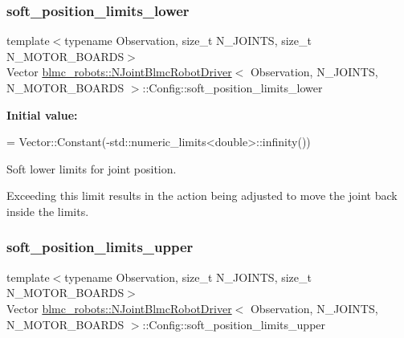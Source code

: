 \subsubsection{\texorpdfstring{soft\+\_\+position\+\_\+limits\+\_\+lower}{soft\_position\_limits\_lower}}
{\footnotesize\ttfamily template$<$typename Observation, size\+\_\+t N\+\_\+\+J\+O\+I\+N\+TS, size\+\_\+t N\+\_\+\+M\+O\+T\+O\+R\+\_\+\+B\+O\+A\+R\+DS$>$ \\
Vector \hyperlink{classblmc__robots_1_1NJointBlmcRobotDriver}{blmc\+\_\+robots\+::\+N\+Joint\+Blmc\+Robot\+Driver}$<$ Observation, N\+\_\+\+J\+O\+I\+N\+TS, N\+\_\+\+M\+O\+T\+O\+R\+\_\+\+B\+O\+A\+R\+DS $>$\+::Config\+::soft\+\_\+position\+\_\+limits\+\_\+lower}

{\bfseries Initial value\+:}
\begin{DoxyCode}
=
        Vector::Constant(-std::numeric\_limits<double>::infinity())
\end{DoxyCode}


Soft lower limits for joint position. 

Exceeding this limit results in the action being adjusted to move the joint back inside the limits. \mbox{\label{structblmc__robots_1_1NJointBlmcRobotDriver_1_1Config_a06ae5378a2d4f7d19a3e8b501651bfbc}} 
\subsubsection{\texorpdfstring{soft\+\_\+position\+\_\+limits\+\_\+upper}{soft\_position\_limits\_upper}}
{\footnotesize\ttfamily template$<$typename Observation, size\+\_\+t N\+\_\+\+J\+O\+I\+N\+TS, size\+\_\+t N\+\_\+\+M\+O\+T\+O\+R\+\_\+\+B\+O\+A\+R\+DS$>$ \\
Vector \hyperlink{classblmc__robots_1_1NJointBlmcRobotDriver}{blmc\+\_\+robots\+::\+N\+Joint\+Blmc\+Robot\+Driver}$<$ Observation, N\+\_\+\+J\+O\+I\+N\+TS, N\+\_\+\+M\+O\+T\+O\+R\+\_\+\+B\+O\+A\+R\+DS $>$\+::Config\+::soft\+\_\+position\+\_\+limits\+\_\+upper}

